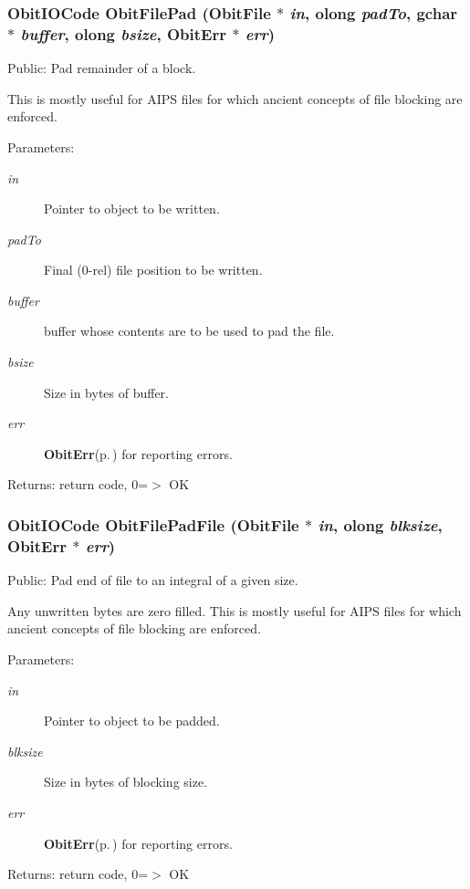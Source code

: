 \subsubsection{\setlength{\rightskip}{0pt plus 5cm}Obit\-IOCode Obit\-File\-Pad ({\bf Obit\-File} $\ast$ {\em in}, {\bf olong} {\em pad\-To}, gchar $\ast$ {\em buffer}, {\bf olong} {\em bsize}, {\bf Obit\-Err} $\ast$ {\em err})}\label{ObitFile_8h_a37}


Public: Pad remainder of a block. 

This is mostly useful for AIPS files for which ancient concepts of file blocking are enforced. \begin{Desc}
\item[Parameters:]
\begin{description}
\item[{\em in}]Pointer to object to be written. \item[{\em pad\-To}]Final (0-rel) file position to be written. \item[{\em buffer}]buffer whose contents are to be used to pad the file. \item[{\em bsize}]Size in bytes of buffer. \item[{\em err}]{\bf Obit\-Err}{\rm (p.\,\pageref{structObitErr})} for reporting errors. \end{description}
\end{Desc}
\begin{Desc}
\item[Returns:]return code, 0=$>$ OK \end{Desc}
\subsubsection{\setlength{\rightskip}{0pt plus 5cm}Obit\-IOCode Obit\-File\-Pad\-File ({\bf Obit\-File} $\ast$ {\em in}, {\bf olong} {\em blksize}, {\bf Obit\-Err} $\ast$ {\em err})}\label{ObitFile_8h_a38}


Public: Pad end of file to an integral of a given size. 

Any unwritten bytes are zero filled. This is mostly useful for AIPS files for which ancient concepts of file blocking are enforced. \begin{Desc}
\item[Parameters:]
\begin{description}
\item[{\em in}]Pointer to object to be padded. \item[{\em blksize}]Size in bytes of blocking size. \item[{\em err}]{\bf Obit\-Err}{\rm (p.\,\pageref{structObitErr})} for reporting errors. \end{description}
\end{Desc}
\begin{Desc}
\item[Returns:]return code, 0=$>$ OK \end{Desc}
